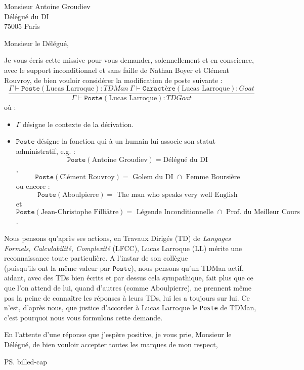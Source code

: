 \documentclass[french]{mpbmail}
\begin{document}
    \begin{letter}{%
        Monsieur Antoine Groudiev\\
        Délégué du DI\\
        75005 Paris
        }
        \opening{Monsieur le Délégué,}

        Je vous écris cette missive pour vous demander, solennellement et en conscience, avec le support inconditionnel et sans faille de Nathan Boyer et Clément Rouvroy, de bien vouloir considérer la modification de poste suivante :
        \[
            \frac{\Gamma \vdash \texttt{Poste}(\text{Lucas Larroque}) : TDMan \ \Gamma \vdash \texttt{Caractère}(\text{Lucas Larroque}) : Goat}{\Gamma \vdash \texttt{Poste}(\text{Lucas Larroque}) : TDGoat }    
        \]
        où : 
        \begin{itemize}
            \item $\Gamma$ désigne le contexte de la dérivation.
            \item $\texttt{Poste}$ désigne la fonction qui à un humain lui associe son statut administratif, e.g. : \[\texttt{Poste}(\text{Antoine Groudiev}) = \text{Délégué du DI}\], \[\texttt{Poste}(\text{Clément Rouvroy}) = \text{ Golem du DI } \cap \text{ Femme Boursière}\] ou encore : \[\texttt{Poste}(\text{Aboulpierre}) =\text{ The man who speaks very well English}\] et \[\texttt{Poste}(\text{Jean-Christophe Filliâtre}) = \text{ Légende Inconditionnelle } \cap \text{ Prof. du Meilleur Cours} \].
        \end{itemize}

        Nous pensons qu'après ses actions, en Travaux Dirigés (TD) de \textit{Langages Formels, Calculabilité, Complexité} (LFCC), Lucas Larroque (LL) mérite une reconnaissance toute particulière. A l'instar de son collègue \\ (puisqu'ils ont la même valeur par $\texttt{Poste}$), nous pensons qu'un TDMan actif, aidant, avec des TDs bien écrits et par dessus cela sympathique, fait plus que ce que l'on attend de lui, quand d'autres (comme Aboulpierre), ne prennent même pas la peine de connaître les réponses à leurs TDs, lui les a toujours sur lui.
        Ce n'est, d'après nous, que justice d'accorder à Lucas Larroque le \texttt{Poste} de TDMan, c'est pourquoi nous vous formulons cette demande.

        \closing{En l'attente d'une réponse que j'espère positive, je vous prie, Monsieur le Délégué, de bien vouloir accepter toutes les marques de mon respect,}
        \ps billed-cap
    \end{letter}
\end{document}
